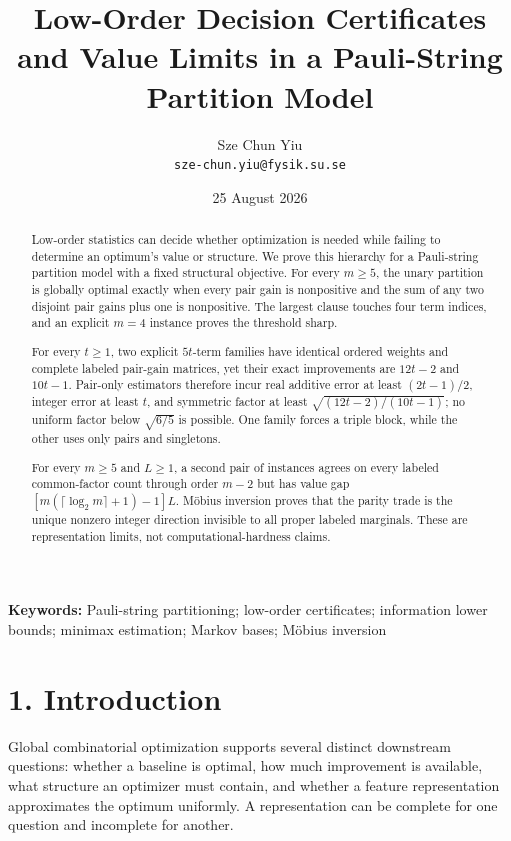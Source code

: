 \documentclass[
  11pt,
]{article}
\title{Low-Order Decision Certificates and Value Limits in a Pauli-String Partition Model}
\author{Sze Chun Yiu\\\texttt{sze-chun.yiu@fysik.su.se}}
\date{25 August 2026}
\begin{document}
\maketitle

\begin{abstract}
Low-order statistics can decide whether optimization is needed while
failing to determine an optimum's value or structure. We prove this
hierarchy for a Pauli-string partition model with a fixed structural
objective. For every \(m\ge5\), the unary partition is globally optimal
exactly when every pair gain is nonpositive and the sum of any two
disjoint pair gains plus one is nonpositive. The largest clause touches
four term indices, and an explicit \(m=4\) instance proves the threshold
sharp.

For every \(t\ge1\), two explicit \(5t\)-term families have identical
ordered weights and complete labeled pair-gain matrices, yet their exact
improvements are \(12t-2\) and \(10t-1\). Pair-only estimators therefore
incur real additive error at least \((2t-1)/2\), integer error at least
\(t\), and symmetric factor at least \(\sqrt{(12t-2)/(10t-1)}\); no
uniform factor below \(\sqrt{6/5}\) is possible. One family forces a
triple block, while the other uses only pairs and singletons.

For every \(m\ge5\) and \(L\ge1\), a second pair of instances agrees on
every labeled common-factor count through order \(m-2\) but has value
gap \([m(\lceil\log_2m\rceil+1)-1]L\). Möbius inversion proves that the
parity trade is the unique nonzero integer direction invisible to all
proper labeled marginals. These are representation limits, not
computational-hardness claims.

\end{abstract}

\noindent\textbf{Keywords:} Pauli-string partitioning; low-order certificates;
information lower bounds; minimax estimation; Markov bases; Möbius
inversion

\hypertarget{introduction}{%
\section{1. Introduction}\label{introduction}}

Global combinatorial optimization supports several distinct downstream
questions: whether a baseline is optimal, how much improvement is
available, what structure an optimizer must contain, and whether a
feature representation approximates the optimum uniformly. A
representation can be complete for one question and incomplete for
another.
\end{document}
